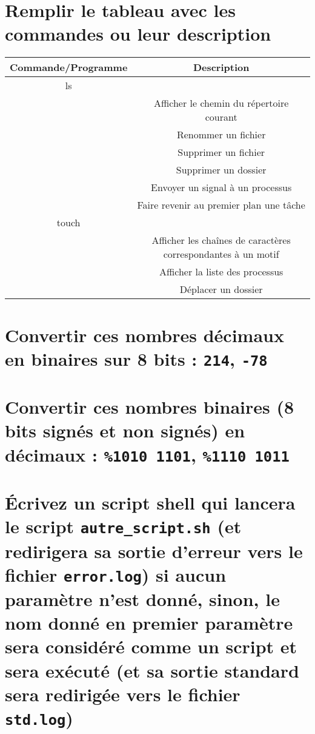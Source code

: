 \documentclass[11pt,a4paper]{article}
\newcommand{\TTBF}[1]{\texttt{\textbf{#1}}}
\begin{document}
\renewcommand\arraystretch{1}


\section{Remplir le tableau avec les commandes ou leur description}

\renewcommand\arraystretch{2.5}

\bigskip
\begin{center}
  \begin{tabular}{| c | c |}
  \hline
  \textbf{Commande/Programme} & \textbf{Description} \\ \hline
  ls & \\ \hline
  & Afficher le chemin du répertoire courant \\ \hline
  & Renommer un fichier \\ \hline
  & Supprimer un fichier \\ \hline
  & Supprimer un dossier \\ \hline
  & Envoyer un signal à un processus \\ \hline
  & Faire revenir au premier plan une tâche \\ \hline
  touch & \\ \hline
  & Afficher les chaînes de caractères correspondantes à un motif \\ \hline
  & Afficher la liste des processus \\ \hline
  & Déplacer un dossier \\
  \hline
  \end{tabular}
\end{center}
\bigskip

\renewcommand\arraystretch{1}

\section{Convertir ces nombres décimaux en binaires sur 8 bits : \texttt{214}, \texttt{-78}}

\bigskip
\bigskip
\bigskip

\section{Convertir ces nombres binaires (8 bits signés et non signés) en décimaux : \texttt{\%1010 1101}, \texttt{\%1110 1011}}

\bigskip
\bigskip
\bigskip
\bigskip

\section{\'Ecrivez un script shell qui lancera le script \TTBF{autre\_script.sh} (et redirigera sa sortie d'erreur vers le fichier \TTBF{error.log}) si aucun paramètre n'est donné, sinon, le nom donné en premier paramètre sera considéré comme un script et sera exécuté (et sa sortie standard sera redirigée vers le fichier \TTBF{std.log}) }

\bigskip
\end{document}
